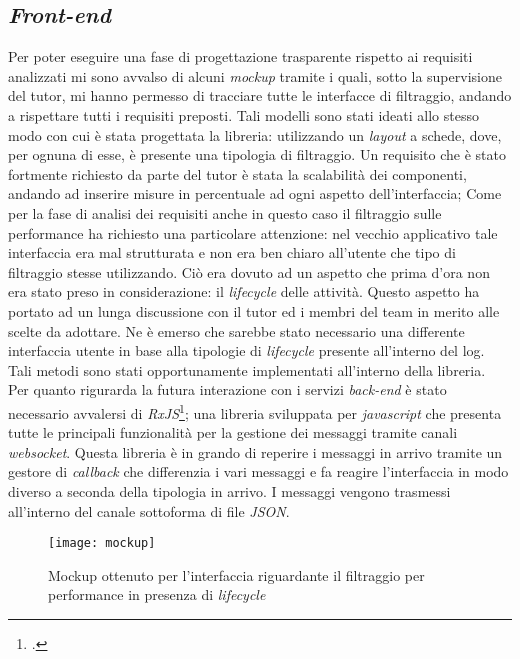 \subsection{\textit{Front-end}}
Per poter eseguire una fase di progettazione trasparente rispetto ai requisiti analizzati mi sono avvalso di alcuni \textit{\gls{mockup}} tramite i quali, sotto la supervisione del tutor, mi hanno permesso di tracciare tutte le interfacce di filtraggio, andando a rispettare tutti i requisiti preposti. Tali modelli sono stati ideati allo stesso modo con cui è stata progettata la libreria: utilizzando un \textit{layout} a schede, dove, per ognuna di esse, è presente una tipologia di filtraggio. Un requisito che è stato fortmente richiesto da parte del tutor è stata la scalabilità dei componenti, andando ad inserire misure in percentuale ad ogni aspetto dell'interfaccia; Come per la fase di analisi dei requisiti anche in questo caso il filtraggio sulle performance ha richiesto una particolare attenzione: nel vecchio applicativo tale interfaccia era mal strutturata e non era ben chiaro all'utente che tipo di filtraggio stesse utilizzando. Ciò era dovuto ad un aspetto che prima d'ora non era stato preso in considerazione: il \textit{lifecycle} delle attività. Questo aspetto ha portato ad un lunga discussione con il tutor ed i membri del team in merito alle scelte da adottare. Ne è emerso che sarebbe stato necessario una differente interfaccia utente in base alla tipologie di \textit{lifecycle} presente all'interno del log. Tali metodi sono stati opportunamente implementati all'interno della libreria.\\
Per quanto rigurarda la futura interazione con i servizi \textit{back-end} è stato necessario avvalersi di \textit{RxJS}\footcite{RxJS: https://rxjs-dev.firebaseapp.com/}; una libreria sviluppata per \textit{javascript} che presenta tutte le principali funzionalità per la gestione dei messaggi tramite canali \textit{websocket}. Questa libreria è in grando di reperire i messaggi in arrivo tramite un gestore di \textit{callback} che differenzia i vari messaggi e fa reagire l'interfaccia in modo diverso a seconda della tipologia in arrivo. I messaggi vengono trasmessi all'interno del canale sottoforma di file \textit{\gls{JSON}}.
\begin{figure}[!h] 
	\centering 
	\texttt{[image: mockup]} 
	\caption{Mockup ottenuto per l'interfaccia riguardante il filtraggio per performance in presenza di \textit{lifecycle}}
\end{figure}
